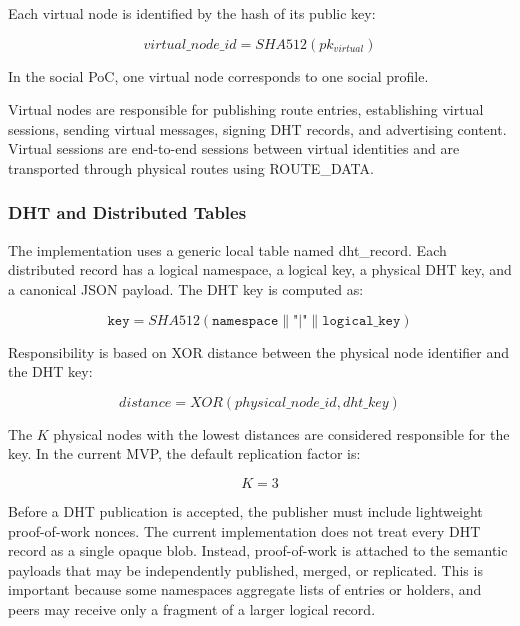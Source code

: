 \documentclass[12pt,a4paper]{article}
\newcommand{\codebreak}[1]{{\footnotesize\ttfamily #1}}
\begin{document}
Each virtual node is identified by the hash of its public key:

\begin{equation}
    virtual\_node\_id = SHA512(pk_{virtual})
\end{equation}

In the social PoC, one virtual node corresponds to one social profile.

Virtual nodes are responsible for publishing route entries, establishing virtual sessions, sending virtual messages, signing DHT records, and advertising content. Virtual sessions are end-to-end sessions between virtual identities and are transported through physical routes using \codebreak{ROUTE\_\allowbreak{}DATA}.

\subsubsection{DHT and Distributed Tables}
\label{subsec:dht-implementation}

The implementation uses a generic local table named \codebreak{dht\_\allowbreak{}record}. Each distributed record has a logical namespace, a logical key, a physical DHT key, and a canonical JSON payload. The DHT key is computed as:

\begin{equation}
    \texttt{key} = SHA512(\texttt{namespace} \parallel \texttt{"|"} \parallel \texttt{logical\_key})
\end{equation}

Responsibility is based on XOR distance between the physical node identifier and the DHT key:

\begin{equation}
    distance = XOR(physical\_node\_id, dht\_key)
\end{equation}

The $K$ physical nodes with the lowest distances are considered responsible for the key. In the current MVP, the default replication factor is:

\begin{equation}
    K = 3
\end{equation}

Before a DHT publication is accepted, the publisher must include lightweight proof-of-work nonces. The current implementation does not treat every DHT record as a single opaque blob. Instead, proof-of-work is attached to the semantic payloads that may be independently published, merged, or replicated. This is important because some namespaces aggregate lists of entries or holders, and peers may receive only a fragment of a larger logical record.
\end{document}
